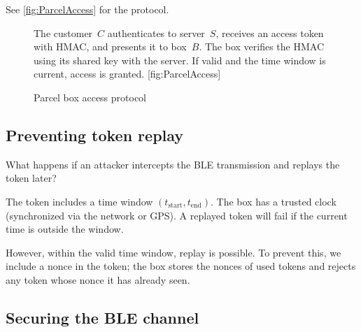 See \cref{fig:ParcelAccess} for the protocol.

\begin{figure}
  \begin{sidecaption}{%
    The customer~\(C\) authenticates to server~\(S\), receives an access
    token with HMAC, and presents it to box~\(B\).
    The box verifies the HMAC using its shared key with the server.
    If valid and the time window is current, access is granted.
  }[fig:ParcelAccess]
  \flushright
  \begin{msc}
    [/msc/action width=0.35\linewidth]
    {Parcel box access protocol}
      \nextlevel[2]
      \nextlevel[2]
      \nextlevel[2]
      \nextlevel
      \nextlevel
      \nextlevel
  \end{msc}
  \end{sidecaption}
\end{figure}

\subsection{Preventing token replay}

\begin{exercise}
  What happens if an attacker intercepts the BLE transmission and replays
  the token later?
\end{exercise}

The token includes a time window \((t_{\text{start}}, t_{\text{end}})\).
The box has a trusted clock (synchronized via the network or GPS).
A replayed token will fail if the current time is outside the window.

However, within the valid time window, replay is possible.
To prevent this, we include a nonce in the token; the box stores the nonces
of used tokens and rejects any token whose nonce it has already seen.

\subsection{Securing the BLE channel}

